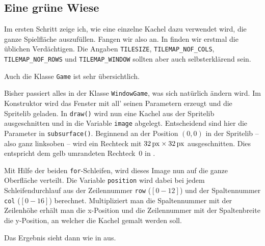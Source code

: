 
\subsection{Eine grüne Wiese}

Im ersten Schritt zeige ich, wie eine einzelne Kachel dazu verwendet wird, die ganze Spielfläche auszufüllen. Fangen wir also an. In  finden wir erstmal die üblichen Verdächtigen. Die Angaben \texttt{TILESIZE}, \texttt{TILEMAP\_NOF\_COLS}, \texttt{TILEMAP\_NOF\_ROWS} und \texttt{TILEMAP\_WINDOW} sollten aber auch selbsterklärend sein.


\newpage
Auch die Klasse \texttt{Game} ist sehr übersichtlich.


Bisher passiert alles in der Klasse \texttt{WindowGame}, was sich natürlich ändern wird. Im Konstruktor wird das Fenster mit all' seinen Parametern erzeugt und die Spritelib geladen. In \texttt{draw()} wird nun eine Kachel aus der Spritelib ausgeschnitten und in die Variable \texttt{image} abgelegt. Entscheidend sind hier die Parameter in \texttt{subsurface()}. Beginnend an der Position $(0,0)$ in der Spritelib -- also ganz linksoben -- wird ein Rechteck mit $\unit[32]{px} \times \unit[32]{px}$ ausgeschnitten. Dies entspricht dem gelb umrandeten Rechteck~0 in .

Mit Hilfe der beiden \texttt{for}-Schleifen, wird dieses Image nun auf die ganze Oberfläche verteilt. Die Variable \texttt{position} wird dabei bei jedem Schleifendurchlauf aus der Zeilennummer \texttt{row} ($[0 - 12]$) und der Spaltennummer \texttt{col} ($[0 - 16]$) berechnet. Multipliziert man die Spaltennummer mit der Zeilenhöhe erhält man die x-Position und die Zeilennummer mit der Spaltenbreite die y-Position, an welcher die Kachel gemalt werden soll.

Das Ergebnis sieht dann wie in  aus.


